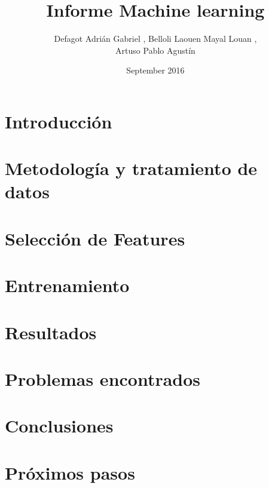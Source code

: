 \documentclass{article}
\title{Informe Machine learning}
\author{Defagot Adrián Gabriel , Belloli Laouen Mayal Louan , \\ Artuso Pablo Agustín}
\date{September 2016}
\begin{document}
\maketitle


\section*{Introducción}


\section*{Metodología y tratamiento de datos}


\section*{Selección de Features}


\section*{Entrenamiento}


\section*{Resultados}


\section*{Problemas encontrados}


\section*{Conclusiones}


\section*{Próximos pasos}




\end{document}
